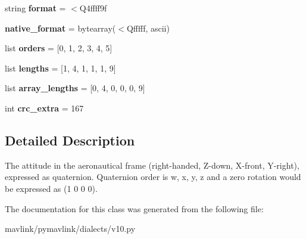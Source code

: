 \begin{DoxyCompactItemize}
string {\bfseries format} = \textquotesingle{}$<$Q4ffff9f\textquotesingle{}
\item 
\mbox{\label{classpymavlink_1_1dialects_1_1v10_1_1MAVLink__attitude__quaternion__cov__message_ac9a6b8adcec79f1b587a582acaf9ec15}} 
{\bfseries native\+\_\+format} = bytearray(\textquotesingle{}$<$Qfffff\textquotesingle{}, \textquotesingle{}ascii\textquotesingle{})
\item 
\mbox{\label{classpymavlink_1_1dialects_1_1v10_1_1MAVLink__attitude__quaternion__cov__message_ad9f9743398729f3d927ddd11bdd466dd}} 
list {\bfseries orders} = \mbox{[}0, 1, 2, 3, 4, 5\mbox{]}
\item 
\mbox{\label{classpymavlink_1_1dialects_1_1v10_1_1MAVLink__attitude__quaternion__cov__message_ad8ceac8a8fe998e2a326f16b8e393d2d}} 
list {\bfseries lengths} = \mbox{[}1, 4, 1, 1, 1, 9\mbox{]}
\item 
\mbox{\label{classpymavlink_1_1dialects_1_1v10_1_1MAVLink__attitude__quaternion__cov__message_a871e509fddb6c39fbd2450685e730eeb}} 
list {\bfseries array\+\_\+lengths} = \mbox{[}0, 4, 0, 0, 0, 9\mbox{]}
\item 
\mbox{\label{classpymavlink_1_1dialects_1_1v10_1_1MAVLink__attitude__quaternion__cov__message_af6396b34ae31b6c3ddc13dc672669385}} 
int {\bfseries crc\+\_\+extra} = 167
\end{DoxyCompactItemize}


\subsection{Detailed Description}
\begin{DoxyVerb}The attitude in the aeronautical frame (right-handed, Z-down,
X-front, Y-right), expressed as quaternion. Quaternion order
is w, x, y, z and a zero rotation would be expressed as (1 0 0
0).
\end{DoxyVerb}
 

The documentation for this class was generated from the following file\+:\begin{DoxyCompactItemize}
\item 
mavlink/pymavlink/dialects/v10.\+py\end{DoxyCompactItemize}
